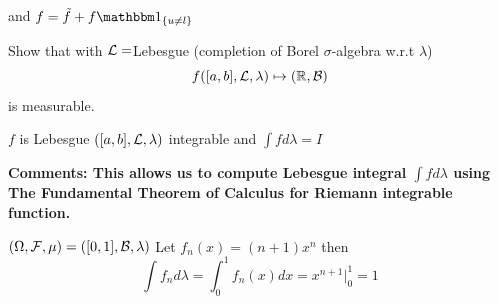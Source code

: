 and $f = \tilde{f} + f\I_{\{u\neq l\}}$
\begin{ex}
Show that with $\mathcal{L} = $Lebesgue (completion of Borel $\sigma$-algebra w.r.t $\lambda$)
\begin{equation*}
    f([a,b], \mathcal{L}, \lambda) \mapsto (\mathbb{R}, \mathcal{B})
\end{equation*} is measurable.
\end{ex}
\begin{cor}$f$ is Lebesgue $([a,b], \mathcal{L}, \lambda)$ integrable and $\int f d\lambda = I$
\end{cor}
\vfill
\textbf{Comments: This allows us to compute Lebesgue integral $\int fd\lambda$ using The Fundamental Theorem of Calculus for Riemann integrable function.}
\begin{example}
$(\Omega, \mathcal{F}, \mu) = ([0,1], \mathcal{B}, \lambda)$ Let $f_n(x) = (n+1)x^n$ then
\begin{equation*}
    \int f_n d\lambda = \int_0^1 f_n(x) dx = x^{n+1} \Big\rvert_0^1 = 1
\end{equation*}
\end{example}